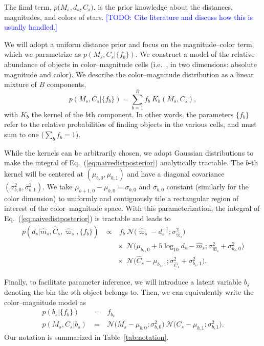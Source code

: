 \documentclass[manuscript, letterpaper]{aastex6}
\newcommand{\ie}{{{i.e.}~}}
\newcommand{\equref}[1]{{\xspace}Eq.~(\ref{#1})}
\newcommand{\equ}[1]{\begin{equation}#1\end{equation}}
\newcommand{\eqn}[1]{\begin{eqnarray}#1\end{eqnarray}}
\newcommand{\todo}[1]{\textcolor{blue}{[TODO: #1]}}
\begin{document}
The final term, $ p\bigl( M_s, d_s, C_s \bigr) $, is the prior knowledge about the distances, magnitudes, and colors of stars. 
\todo{Cite literature and discuss how this is usually handled.}

We will adopt a uniform distance prior and focus on the magnitude--color term, which we parametrize as $p\left(M_s, C_s  \bigr\rvert \{ f_{b} \} \right) $.
We construct a model of the relative abundance of objects in color--magnitude cells (\ie, in two dimensions: absolute magnitude and color).
We describe the color--magnitude distribution as a linear mixture of $B$ components,
\equ{
	p\left(M_s, C_s  \bigr\rvert \{ f_{b} \} \right) = \sum_{b=1}^B f_b \ K_b(M_s, C_s),
} 
with $K_b$ the kernel of the $b$th component. 
In other words, the parameters $\{ f_{b} \}$ refer to the relative probabilities of finding objects in the various cells, and must sum to one ($\sum_b f_b = 1$).

While the kernels can be arbitrarily chosen, we adopt Gaussian distributions to make the integral of \equref{eq:naivedistposterior} analytically tractable.
The $b$-th kernel will be centered at $(\mu_{b,0}, \mu_{b,1})$ and have a diagonal covariance $(\sigma_{b,0}^2, \sigma_{b,1}^2)$.
We take $\mu_{b+1,0}-\mu_{b,0} = \sigma_{b,0}$ and $\sigma_{b,0}$ constant (similarly for the color dimension) to uniformly and contiguously tile a rectangular region of interest of the color--magnitude space. 
With this parameterization, the integral of \equref{eq:naivedistposterior} is tractable and leads to
\eqn{
	p(d_s | \hat{m}_s, \hat{C}_s, \hat{\varpi}_s, \{ f_{b} \})  \ &\propto&  \ f_b \ \mathcal{N}\bigl(\hat{\varpi}_s - d_s^{-1};\sigma_{\hat{\varpi}_s}^2 \bigr) \\ 
	&&\times \ \ \mathcal{N}\bigl( \mu_{b_s,0} + 5\log_{10}d_s  -\hat{m}_s ;\sigma_{\hat{m}_s}^2 + \sigma_{b_s,0}^2 \bigr) \nonumber\\ 
	&&\times \ \ \mathcal{N}\bigl(\hat{C}_s - \mu_{b_s,1};\sigma_{\hat{C}_s}^2 + \sigma_{b_s,1}^2 \bigr). \label{eq:distposterior}\nonumber
}

Finally, to facilitate parameter inference, we will introduce a latent variable $b_s$ denoting the bin the $s$th object belongs to.
Then, we can equivalently write the color--magnitude model as
\eqn{
	p\left(b_s \bigr\rvert \bigl\{ f_b \bigr\}\right) \ &=& \ f_{b_s} \\ 
	p\left(M_s, C_s \bigr\rvert b_s \right) \ &=& \ \mathcal{N}\bigl(M_s - \mu_{b,0};\sigma_{b,0}^2 \bigr)  \ \mathcal{N}\bigl(C_s - \mu_{b,1};\sigma_{b,1}^2 \bigr).\nonumber
}
Our notation is summarized in Table~\ref{tab:notation}.
\end{document}
